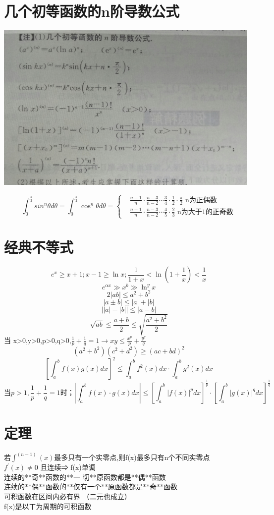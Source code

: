 \documentclass[UTF8]{ctexart}
\begin{document}
\section{几个初等函数的n阶导数公式}
\includegraphics[width=13cm]{9345E7/2A793F093B002F668B144F9ED087EB77.jpg}


$$ \int_0^\frac{\pi}{2} sin^n θ d \theta =\int_0^\frac{\pi}{2} \cos^n \theta d \theta =
\begin{cases}
  &\frac{n-1}{n}\cdot\frac{n-3}{n-2} \cdots \frac{3}{4}\cdot\frac{1}{2}\cdot\frac{\pi}{2}\mbox{  n为正偶数} \\
  &\frac{n-1}{n}\cdot\frac{n-3}{n-2}\cdots\frac{4}{5}\cdot\frac{2}{3}\mbox{  n为大于1的正奇数}
\end{cases}
$$

\section{经典不等式}
$$e^x \geq x+1 ; x-1 \geq \ln x ; \frac{1}{1+x} < \ln \left( 1+ \frac{1}{x} \right) < \frac{1}{x}$$
$$ e^{αx} \gg x^b \gg \ln^y x $$
$$ 2\left| ab \right| \leq a^2+b^2$$
$$ \left| a \pm b \right| \leq |a|+|b|$$
$$ \left| |a| - |b| \right| \leq |a-b|$$
$$\sqrt{ab} \leq \frac{a+b}{2} \leq \sqrt{\frac{a^2+b^2}{2}}$$
当 x>0,y>0,p>0,q>0,$\frac{1}{p}+\frac{1}{q}=1 \rightarrow xy \leq \frac{x^p}{p}+\frac{y^q}{q}$
$$(a^2+b^2)(c^2+d^2) \geq (ac+bd)^2$$
$$ [\int_a^b f(x)g(x)dx]^2 \leq \int_a^b f^2(x)dx\cdot \int_a^b g^2(x)dx$$
$$\mbox{当} p>1, \frac{1}{p}+\frac{1}{q}=1 \mbox{时；} \left| \int_a^b f(x) \cdot g(x)dx\right| \leq \left[ \int_a^b \left| f(x) \right|^p dx \right] ^\frac{1}{p} \cdot \left[ \int_a^b \left| g(x) \right|^q dx \right] ^\frac{1}{q}$$

\section{定理}
​若$\int^{(n-1)}(x)$最多只有一个实零点,则f(x)最多只有n个不同实零点 \\
$f^′(x)≠0$ 且连续⇒ f(x)单调 \\
连续的**奇**函数的**一  切**原函数都是**偶**函数 \\
连续的**偶**函数的**仅有一个**原函数都是**奇**函数 \\
可积函数在区间内必有界 （二元也成立） \\
f(x)是以ㄒ为周期的可积函数 \\
\end{document}
